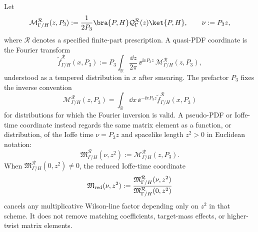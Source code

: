 Let
\begin{equation}
  \mathcal M_{\Gamma/H}^{\mathcal R}(z,P_3)
  :=
  \frac{1}{2P_3}
  \bra{P,H}\mathcal Q_\Gamma^{\mathcal R}(z)\ket{P,H},
  \qquad
  \nu:=P_3z ,
  \label{eq:qcd-spatial-bilocal-matrix-element}
\end{equation}
where \(\mathcal R\) denotes a specified finite-part prescription.  A quasi-PDF
coordinate is the Fourier transform
\begin{equation}
  \widetilde f_{\Gamma/H}^{\mathcal R}(x,P_3)
  :=
  P_3\int_{\mathbb R}\frac{\dd z}{2\pi}\,
  \ee^{\ii xP_3z}\,
  \mathcal M_{\Gamma/H}^{\mathcal R}(z,P_3),
  \label{eq:qcd-quasi-pdf-coordinate}
\end{equation}
understood as a tempered distribution in \(x\) after smearing.  The prefactor
\(P_3\) fixes the inverse convention
\[
  \mathcal M_{\Gamma/H}^{\mathcal R}(z,P_3)
  =
  \int_{\mathbb R}\dd x\,
  \ee^{-\ii xP_3z}
  \widetilde f_{\Gamma/H}^{\mathcal R}(x,P_3)
\]
for distributions for which the Fourier inversion is valid.  A pseudo-PDF or
Ioffe-time coordinate instead regards the same matrix element as a function,
or distribution, of the Ioffe time \(\nu=P_3z\) and spacelike length
\(z^2>0\) in Euclidean notation:
\begin{equation}
  \mathfrak M_{\Gamma/H}^{\mathcal R}(\nu,z^2)
  :=
  \mathcal M_{\Gamma/H}^{\mathcal R}(z,P_3).
  \label{eq:qcd-pseudo-itd-coordinate}
\end{equation}
When \(\mathfrak M_{\Gamma/H}^{\mathcal R}(0,z^2)\ne0\), the reduced
Ioffe-time coordinate
\[
  \mathfrak M_{\rm red}(\nu,z^2)
  :=
  \frac{\mathfrak M_{\Gamma/H}^{\mathcal R}(\nu,z^2)}
       {\mathfrak M_{\Gamma/H}^{\mathcal R}(0,z^2)}
\]
cancels any multiplicative Wilson-line factor depending only on \(z^2\) in
that scheme.  It does not remove matching coefficients, target-mass effects,
or higher-twist matrix elements.

